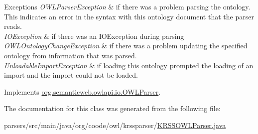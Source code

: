 \begin{DoxyExceptions}{Exceptions}
{\em O\-W\-L\-Parser\-Exception} & if there was a problem parsing the ontology. This indicates an error in the syntax with this ontology document that the parser reads. \\
\hline
{\em I\-O\-Exception} & if there was an I\-O\-Exception during parsing \\
\hline
{\em O\-W\-L\-Ontology\-Change\-Exception} & if there was a problem updating the specified ontology from information that was parsed. \\
\hline
{\em Unloadable\-Import\-Exception} & if loading this ontology prompted the loading of an import and the import could not be loaded. \\
\hline
\end{DoxyExceptions}


Implements \hyperlink{interfaceorg_1_1semanticweb_1_1owlapi_1_1io_1_1_o_w_l_parser_a259739c6baf94f4e5a2dad5d0400f07a}{org.\-semanticweb.\-owlapi.\-io.\-O\-W\-L\-Parser}.



The documentation for this class was generated from the following file\-:\begin{DoxyCompactItemize}
\item 
parsers/src/main/java/org/coode/owl/krssparser/\hyperlink{_k_r_s_s_o_w_l_parser_8java}{K\-R\-S\-S\-O\-W\-L\-Parser.\-java}\end{DoxyCompactItemize}
